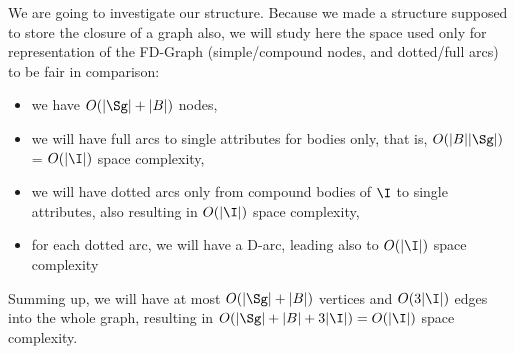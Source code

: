 \vspace{1.2em}

We are going to investigate our structure. Because we made a structure supposed
to store the closure of a graph also, we will study here the space used only
for representation of the FD-Graph (simple/compound nodes, and dotted/full 
arcs) to be fair in comparison:
\begin{itemize}
	\item we have $O(|\Sg| + |B|)$ nodes,
	\item we will have full arcs to single attributes for bodies only, 
	that is, $O(|B||\Sg|)$ = $O(|\I|)$ space complexity,
	\item we will have dotted arcs only from compound bodies of $\I$ to 
	single attributes, also resulting in $O(|\I|)$ space complexity,
	\item for each dotted arc, we will have a D-arc, leading also to $O(|\I|)$
	space complexity
\end{itemize}
Summing up, we will have at most $O(|\Sg| + |B|)$ vertices and $O(3|\I|)$ 
edges into the whole graph, resulting in $O(|\Sg| + |B| + 3|\I|) = O(|\I|)$ 
space complexity. 

\vspace{1.2em}

